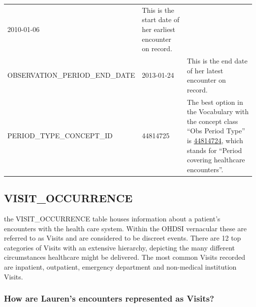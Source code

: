\documentclass[11pt]{book}
\theoremstyle{definition}
\theoremstyle{definition}
\theoremstyle{definition}
\theoremstyle{remark}
\begin{document}
\begin{longtable}[]{@{}lll@{}}
\begin{minipage}[t]{0.15\columnwidth}
2010-01-06\strut
\end{minipage} & \begin{minipage}[t]{0.49\columnwidth}\raggedright
This is the start date of her earliest encounter on record.\strut
\end{minipage}\tabularnewline
\begin{minipage}[t]{0.28\columnwidth}\raggedright
OBSERVATION\_PERIOD\_END\_DATE\strut
\end{minipage} & \begin{minipage}[t]{0.15\columnwidth}\raggedright
2013-01-24\strut
\end{minipage} & \begin{minipage}[t]{0.49\columnwidth}\raggedright
This is the end date of her latest encounter on record.\strut
\end{minipage}\tabularnewline
\begin{minipage}[t]{0.28\columnwidth}\raggedright
PERIOD\_TYPE\_CONCEPT\_ID\strut
\end{minipage} & \begin{minipage}[t]{0.15\columnwidth}\raggedright
44814725\strut
\end{minipage} & \begin{minipage}[t]{0.49\columnwidth}\raggedright
The best option in the Vocabulary with the concept class ``Obs Period Type'' is \href{http://athena.ohdsi.org/search-terms/terms/44814724}{44814724}, which stands for ``Period covering healthcare encounters''.\strut
\end{minipage}\tabularnewline
\bottomrule
\end{longtable}

\hypertarget{visitOccurrence}{%
\subsection{VISIT\_OCCURRENCE}\label{visitOccurrence}}

the VISIT\_OCCURRENCE table houses information about a patient's encounters with the health care system. Within the OHDSI vernacular these are referred to as Visits and are considered to be discreet events. There are 12 top categories of Visits with an extensive hierarchy, depicting the many different circumstances healthcare might be delivered. The most common Visits recorded are inpatient, outpatient, emergency department and non-medical institution Visits.

\hypertarget{how-are-laurens-encounters-represented-as-visits}{%
\subsubsection*{How are Lauren's encounters represented as Visits?}\label{how-are-laurens-encounters-represented-as-visits}}
\end{document}
